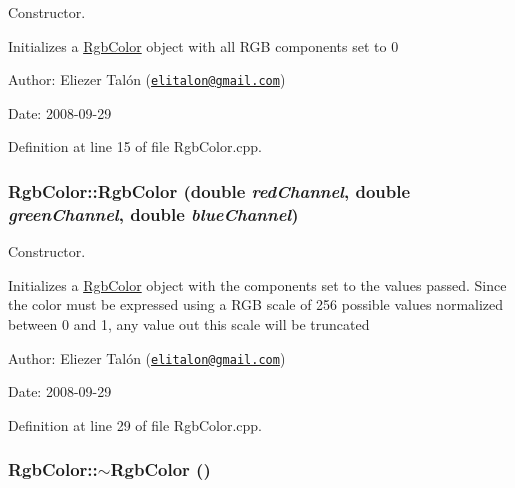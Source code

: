 Constructor. 

Initializes a \hyperlink{struct_rgb_color}{RgbColor} object with all RGB components set to 0

\begin{Desc}
\item[Author:]Eliezer Talón (\href{mailto:elitalon@gmail.com}{\tt elitalon@gmail.com}) \end{Desc}
\begin{Desc}
\item[Date:]2008-09-29 \end{Desc}


Definition at line 15 of file RgbColor.cpp.\hypertarget{struct_rgb_color_22ba5d2a596e39ca39b835b5571fd2c0}{
\subsubsection[RgbColor]{\setlength{\rightskip}{0pt plus 5cm}RgbColor::RgbColor (double {\em redChannel}, \/  double {\em greenChannel}, \/  double {\em blueChannel})}}
\label{struct_rgb_color_22ba5d2a596e39ca39b835b5571fd2c0}


Constructor. 

Initializes a \hyperlink{struct_rgb_color}{RgbColor} object with the components set to the values passed. Since the color must be expressed using a RGB scale of 256 possible values normalized between 0 and 1, any value out this scale will be truncated

\begin{Desc}
\item[Author:]Eliezer Talón (\href{mailto:elitalon@gmail.com}{\tt elitalon@gmail.com}) \end{Desc}
\begin{Desc}
\item[Date:]2008-09-29 \end{Desc}


Definition at line 29 of file RgbColor.cpp.\hypertarget{struct_rgb_color_1d4e0b01edaea01389a3fd3e02ed9f74}{
\subsubsection[$\sim$RgbColor]{\setlength{\rightskip}{0pt plus 5cm}RgbColor::$\sim$RgbColor ()}}
\label{struct_rgb_color_1d4e0b01edaea01389a3fd3e02ed9f74}


